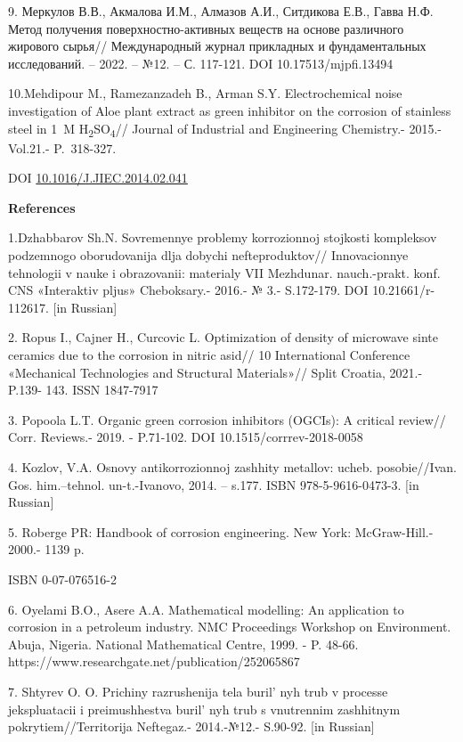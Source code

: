 9. Меркулов В.В., Акмалова И.М., Алмазов А.И., Ситдикова Е.В., Гавва
Н.Ф. Метод получения поверхностно-активных веществ на основе различного
жирового сырья// Международный журнал прикладных и фундаментальных
исследований. -- 2022. -- №12. -- С. 117-121. DOI 10.17513/mjpfi.13494

10.Mehdipour M., Ramezanzadeh B., Arman S.Y. Electrochemical noise
investigation of Aloe plant extract as green inhibitor on the corrosion
of stainless steel in 1~M H\textsubscript{2}SO\textsubscript{4}//
Journal of Industrial and Engineering Chemistry.- 2015.-Vol.21.-
P.~318-327.

DOI
\href{https://doi.org/10.1016/J.JIEC.2014.02.041}{10.1016/J.JIEC.2014.02.041}

{\bfseries References}

1.Dzhabbarov Sh.N. Sovremennye problemy korrozionnoj stojkosti
kompleksov podzemnogo oborudovanija dlja dobychi nefteproduktov//
Innovacionnye tehnologii v nauke i obrazovanii: materialy VII Mezhdunar.
nauch.-prakt. konf. CNS «Interaktiv pljus» Cheboksary.- 2016.- № 3.-
S.172-179. DOI 10.21661/r-112617. {[}in Russian{]}

2. Ropus I., Cajner H., Curcovic L. Optimization of density of microwave
sinte ceramics due to the corrosion in nitric asid// 10 International
Conference «Mechanical Technologies and Structural Materials»// Split
Croatia, 2021.- P.139- 143. ISSN 1847-7917

3. Popoola L.T. Organic green corrosion inhibitors (OGCIs): A critical
review// Corr. Reviews.- 2019. - P.71-102. DOI 10.1515/corrrev-2018-0058

4. Kozlov, V.A. Osnovy antikorrozionnoj zashhity metallov: ucheb.
posobie//Ivan. Gos. him.--tehnol. un-t.-Ivanovo, 2014. -- s.177. ISBN
978-5-9616-0473-3. {[}in Russian{]}

5. Roberge PR: Handbook of corrosion engineering. New York:
McGraw-Hill.- 2000.- 1139 p.

ISBN 0-07-076516-2

6. Oyelami B.O., Asere A.A. Mathematical modelling: An application to
corrosion in a petroleum industry. NMC Proceedings Workshop on
Environment. Abuja, Nigeria. National Mathematical Centre, 1999. - P.
48-66. https://www.researchgate.net/publication/252065867

7. Shtyrev O. O. Prichiny razrushenija tela buril' nyh
trub v processe jekspluatacii i preimushhestva buril' nyh
trub s vnutrennim zashhitnym pokrytiem//Territorija Neftegaz.-
2014.-№12.- S.90-92. {[}in Russian{]}

